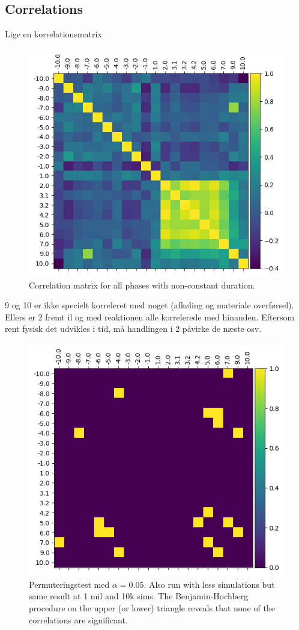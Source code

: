 \documentclass[../Thesis.tex]{subfiles}
\begin{document}
\subsection{Correlations}

Lige en korrelationsmatrix
\begin{figure}[H]
    \centering
    \includegraphics[width=.9\linewidth]{figures/Multiple cycles data/Correlation matrix production and delays.png}
    \caption{Correlation matrix for all phases with non-constant duration.}
\end{figure}

9 og 10 er ikke specielt korreleret med noget (afkøling og materiale overførsel). Ellers er 2 fremt il og med reaktionen alle korrelerede med hinanden. Eftersom rent fysisk det udvikles i tid, må handlingen i 2 påvirke de næste osv. 

\begin{figure}
    \centering
    \includegraphics[width=.9\linewidth]{figures/Multiple cycles data/Permutation test rho 10 mil.png}
    \caption{Permuteringstest med $\alpha = 0.05$. Also run with less simulations but same result at 1 mil and 10k sims. The Benjamin-Hochberg procedure on the upper (or lower) triangle reveals that none of the correlations are significant.}
\end{figure}
\end{document}

